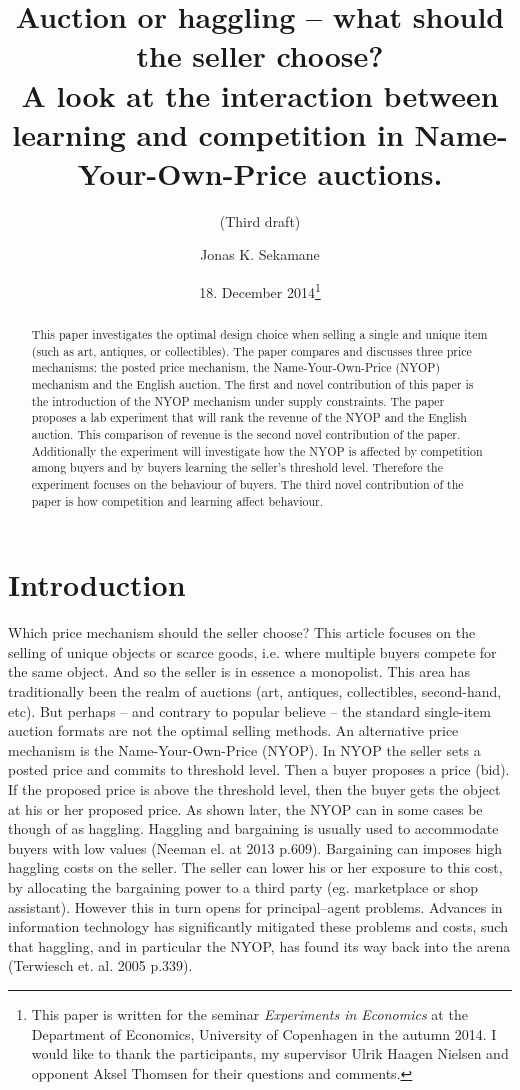 \documentclass[a4paper,12pt]{article}
\title{\Large {\bf Auction or haggling -- what should the seller choose?} \\ A look at the interaction between learning and competition in Name-Your-Own-Price auctions.}
\subtitle{(Third draft)}
\author{Jonas K. Sekamane}
\date{18. December 2014\thanks{This paper is written for the seminar \emph{Experiments in Economics} at the Department of Economics, University of Copenhagen in the autumn 2014. I would like to thank the participants, my supervisor Ulrik Haagen Nielsen and opponent Aksel Thomsen for their questions and comments.}}
\begin{document}
	
	\clearpage
	\thispagestyle{empty}
	
	\maketitle{}
		
	\newpage
	
	\clearpage %
	\setcounter{page}{1}
	
	\begin{abstract}
		{This paper investigates the optimal design choice when selling a single and unique item (such as art, antiques, or collectibles). The paper compares and discusses three price mechanisms: the posted price mechanism, the Name-Your-Own-Price (NYOP) mechanism and the English auction. The first and novel contribution of this paper is the introduction of the NYOP mechanism under supply constraints. The paper proposes a lab experiment that will rank the revenue of the NYOP and the English auction. This comparison of revenue is the second novel contribution of the paper. Additionally the experiment will investigate how the NYOP is affected by competition among buyers and by buyers learning the seller's threshold level. Therefore the experiment focuses on the behaviour of buyers. The third novel contribution of the paper is how competition and learning affect behaviour.}
	\end{abstract}
	
	

	\section{Introduction}

	Which price mechanism should the seller choose? This article focuses on the selling of unique objects or scarce goods, i.e. where multiple buyers compete for the same object. And so the seller is in essence a monopolist. This area has traditionally been the realm of auctions (art, antiques, collectibles, second-hand, etc). But perhaps -- and contrary to popular believe -- the standard single-item auction formats are not the optimal selling methods. An alternative price mechanism is the Name-Your-Own-Price (NYOP). In NYOP the seller sets a posted price and commits to threshold level. Then a buyer proposes a price (bid). If the proposed price is above the threshold level, then the buyer gets the object at his or her proposed price. As shown later, the NYOP can in some cases be though of as haggling. Haggling and bargaining is usually used to accommodate buyers with low values (Neeman el. at 2013 p.609). Bargaining can imposes high haggling costs on the seller. The seller can lower his or her exposure to this cost, by allocating the bargaining power to a third party (eg. marketplace or shop assistant). However this in turn opens for principal–agent problems. Advances in information technology has significantly mitigated these problems and costs, such that haggling, and in particular the NYOP, has found its way back into the arena (Terwiesch et. al. 2005 p.339).
	
\end{document}
